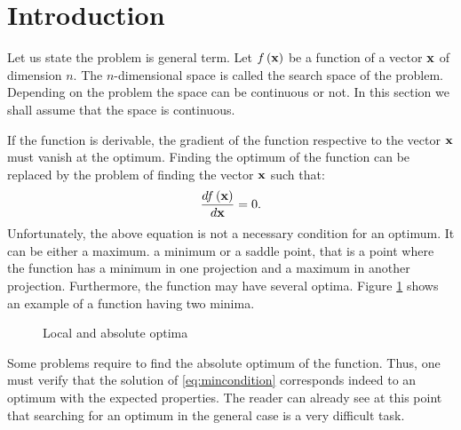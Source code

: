 \documentclass[twoside]{book}
\begin{document}
\section{Introduction}
\label{sec:optimum} Let us state the problem is general term. Let
$f\left({\bf x}\right)$ be a function of a vector ${\bf x}$ of
dimension $n$. The $n$-dimensional space is called the search
space of the problem. Depending on the problem the space can be
continuous or not. In this section we shall assume that the space
is continuous.

If the function is derivable, the gradient of the function
respective to the vector ${\bf x}$ must vanish at the optimum.
Finding the optimum of the function can be replaced by the problem
of finding the vector ${\bf x}$ such that:
\begin{equation}
\label{eq:mincondition}
  {d f\left({\bf x}\right) \over d{\bf x}} = 0.
\end{equation}
Unfortunately, the above equation is not a necessary condition for
an optimum. It can be either a maximum. a minimum or a saddle
point, that is a point where the function has a minimum in one
projection and a maximum in another projection. Furthermore, the
function may have several optima. Figure \ref{fig:localabsobulte}
shows an example of a function having two minima.
\begin{figure}
\center{}
\caption{Local and absolute optima} \label{fig:localabsobulte}
\end{figure}
Some problems require to find the absolute optimum of the
function. Thus, one must verify that the solution of
\ref{eq:mincondition} corresponds indeed to an optimum with the
expected properties. The reader can already see at this point that
searching for an optimum in the general case is a very difficult
task.
\end{document}
